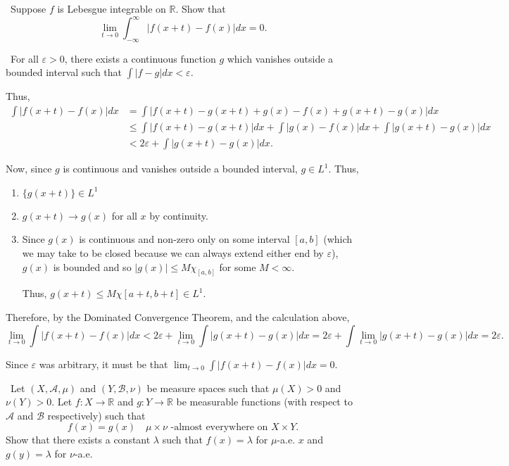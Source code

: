\documentclass[12pt]{Qual}
\begin{document}
\begin{problem} $\,$
Suppose $f$ is Lebesgue integrable on $\mathbb{R}$. Show that $$\lim_{t\to0}\int_{-\infty}^\infty|f(x+t)-f(x)|dx=0.$$
\end{problem}


\begin{solution}$\,$
For all $\varepsilon>0$, there exists a continuous function $g$ which vanishes outside a bounded interval such that $\int|f-g|dx<\varepsilon$.

Thus, \begin{align*}
    \int|f(x+t)-f(x)|dx&=\int|f(x+t)-g(x+t)+g(x)-f(x)+g(x+t)-g(x)|dx\\
    &\le\int|f(x+t)-g(x+t)|dx+\int|g(x)-f(x)|dx+\int|g(x+t)-g(x)|dx\\
    &<2\varepsilon+\int|g(x+t)-g(x)|dx.
\end{align*}

Now, since $g$ is continuous and vanishes outside a bounded interval, $g\in L^1$. Thus,
\begin{enumerate}
    \item $\{g(x+t)\}\in L^1$
    \item $g(x+t)\to g(x)$ for all $x$ by continuity.
    \item Since $g(x)$ is continuous and non-zero only on some interval $[a,b]$ (which we may take to be closed because we can always extend either end by $\varepsilon$), $g(x)$ is bounded and so $|g(x)|\le M\chi_{[a,b]}$ for some $M<\infty$.

    Thus, $g(x+t)\le M\chi{[a+t,b+t]}\in L^1$.
\end{enumerate}

Therefore, by the Dominated Convergence Theorem, and the calculation above, $$\lim_{t\to0}\int|f(x+t)-f(x)|dx< 2\varepsilon+\lim_{t\to0}\int|g(x+t)-g(x)|dx=2\varepsilon+\int\lim_{t\to0}|g(x+t)-g(x)|dx=2\varepsilon.$$

Since $\varepsilon$ was arbitrary, it must be that $\lim_{t\to0}\int|f(x+t)-f(x)|dx=0$.
\end{solution}
\newpage

\begin{problem} $\,$
Let $(X,\mathscr{A},\mu)$ and $(Y,\mathscr{B},\nu)$ be measure spaces such that $\mu(X)>0$ and $\nu(Y)>0$. Let $f:X\to\mathbb{R}$ and $g:Y\to\mathbb{R}$ be measurable functions (with respect to $\mathscr{A}$ and $\mathscr{B}$ respectively) such that $$f(x)=g(x)\quad \mu\times\nu\text{ -almost everywhere on }X\times Y.$$
Show that there exists a constant $\lambda$ such that $f(x)=\lambda$ for $\mu$-a.e. $x$ and $g(y)=\lambda$ for $\nu$-a.e.
\end{problem}
\end{document}
